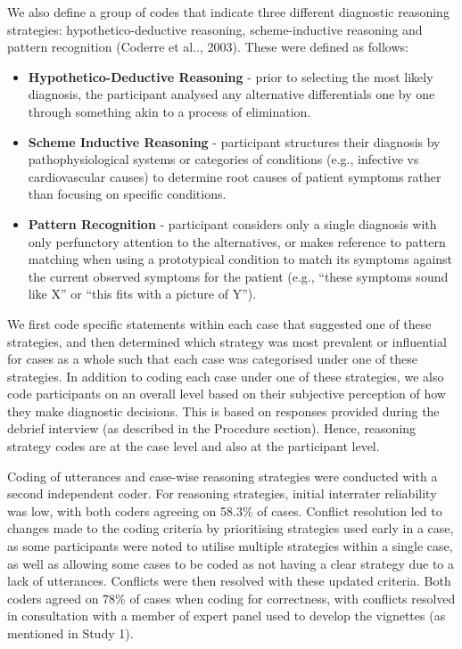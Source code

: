 \documentclass[a4paper, nobind]{templates/ociamthesis}
\providecommand{\tightlist}{%
  \setlength{\itemsep}{0pt}\setlength{\parskip}{0pt}}
\begin{document}
We also define a group of codes that indicate three different diagnostic reasoning strategies: hypothetico-deductive reasoning, scheme-inductive reasoning and pattern recognition (Coderre et al.., 2003). These were defined as follows:

\begin{itemize}
\tightlist
\item
  \textbf{Hypothetico-Deductive Reasoning} - prior to selecting the most likely diagnosis, the participant analysed any alternative differentials one by one through something akin to a process of elimination.
\item
  \textbf{Scheme Inductive Reasoning} - participant structures their diagnosis by pathophysiological systems or categories of conditions (e.g., infective vs cardiovascular causes) to determine root causes of patient symptoms rather than focusing on specific conditions.
\item
  \textbf{Pattern Recognition} - participant considers only a single diagnosis with only perfunctory attention to the alternatives, or makes reference to pattern matching when using a prototypical condition to match its symptoms against the current observed symptoms for the patient (e.g., ``these symptoms sound like X'' or ``this fits with a picture of Y'').
\end{itemize}

We first code specific statements within each case that suggested one of these strategies, and then determined which strategy was most prevalent or influential for cases as a whole such that each case was categorised under one of these strategies. In addition to coding each case under one of these strategies, we also code participants on an overall level based on their subjective perception of how they make diagnostic decisions. This is based on responses provided during the debrief interview (as described in the Procedure section). Hence, reasoning strategy codes are at the case level and also at the participant level.

Coding of utterances and case-wise reasoning strategies were conducted with a second independent coder. For reasoning strategies, initial interrater reliability was low, with both coders agreeing on 58.3\% of cases. Conflict resolution led to changes made to the coding criteria by prioritising strategies used early in a case, as some participants were noted to utilise multiple strategies within a single case, as well as allowing some cases to be coded as not having a clear strategy due to a lack of utterances. Conflicts were then resolved with these updated criteria. Both coders agreed on 78\% of cases when coding for correctness, with conflicts resolved in consultation with a member of expert panel used to develop the vignettes (as mentioned in Study 1).
\end{document}
